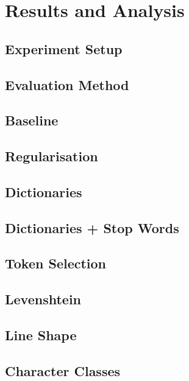 
\chapter{Results and Analysis} %

\label{Chapter5} %



\section{Experiment Setup}
\section{Evaluation Method}
\section{Baseline}
\section{Regularisation}
\section{Dictionaries}
\section{Dictionaries + Stop Words}
\section{Token Selection}
\section{Levenshtein}
\section{Line Shape}
\section{Character Classes}